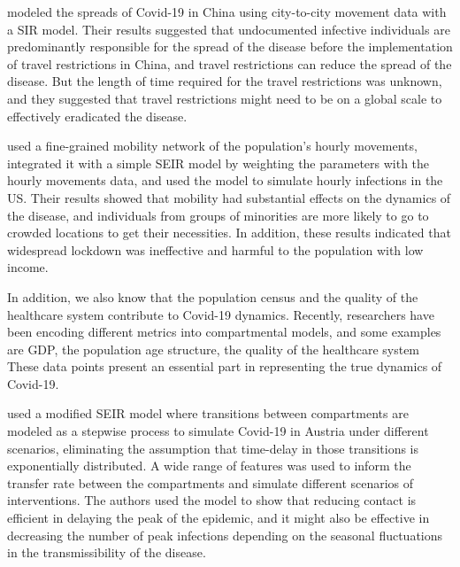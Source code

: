 \citeauthor{liSubstantialUndocumentedInfection2020} \cite{liSubstantialUndocumentedInfection2020} modeled the spreads of Covid-19 in China using city-to-city movement data with a \gls{SIR} model.
Their results suggested that undocumented infective individuals are predominantly responsible for the spread of the disease before the implementation of travel restrictions in China, and travel restrictions can reduce the spread of the disease.
But the length of time required for the travel restrictions was unknown, and they suggested that travel restrictions might need to be on a global scale to effectively eradicated the disease.

\citeauthor{changMobilityNetworkModels2021} \cite{changMobilityNetworkModels2021} used a fine-grained mobility network of the population's hourly movements, integrated it with a simple \gls{SEIR} model by weighting the parameters with the hourly movements data, and used the model to simulate hourly infections in the US.
Their results showed that mobility had substantial effects on the dynamics of the disease, and individuals from groups of minorities are more likely to go to crowded locations to get their necessities.
In addition, these results indicated that widespread lockdown was ineffective and harmful to the population with low income.

In addition, we also know that the population census and the quality of the healthcare system contribute to Covid-19 dynamics.
Recently, researchers have been encoding different metrics into compartmental models, and some examples are \gls{GDP}, the population age structure, the quality of the healthcare system
These data points present an essential part in representing the true dynamics of Covid-19.

\citeauthor{schneiderCOVID19PandemicPreparedness2020} \cite{schneiderCOVID19PandemicPreparedness2020} used a modified \gls{SEIR} model where transitions between compartments are modeled as a stepwise process to simulate Covid-19 in Austria under different scenarios, eliminating the assumption that time-delay in those transitions is exponentially distributed.
A wide range of features was used to inform the transfer rate between the compartments and simulate different scenarios of interventions.
The authors used the model to show that reducing contact is efficient in delaying the peak of the epidemic, and it might also be effective in decreasing the number of peak infections depending on the seasonal fluctuations in the transmissibility of the disease.

